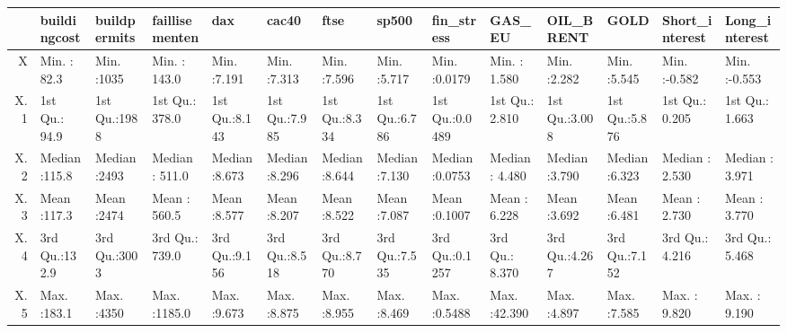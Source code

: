\begin{table}[ht]
\centering
\begin{tabular}{rlllllllllllll}
  \hline
 &  buildingcost &  buildpermits & faillisementen &      dax &     cac40 &      ftse &     sp500 &   fin\_stress &     GAS\_EU &   OIL\_BRENT &      GOLD & Short\_interest & Long\_interest \\ 
  \hline
X & Min.   : 82.3   & Min.   :1035   & Min.   : 143.0   & Min.   :7.191   & Min.   :7.313   & Min.   :7.596   & Min.   :5.717   & Min.   :0.0179   & Min.   : 1.580   & Min.   :2.282   & Min.   :5.545   & Min.   :-0.582   & Min.   :-0.553   \\ 
  X.1 & 1st Qu.: 94.9   & 1st Qu.:1988   & 1st Qu.: 378.0   & 1st Qu.:8.143   & 1st Qu.:7.985   & 1st Qu.:8.334   & 1st Qu.:6.786   & 1st Qu.:0.0489   & 1st Qu.: 2.810   & 1st Qu.:3.008   & 1st Qu.:5.876   & 1st Qu.: 0.205   & 1st Qu.: 1.663   \\ 
  X.2 & Median :115.8   & Median :2493   & Median : 511.0   & Median :8.673   & Median :8.296   & Median :8.644   & Median :7.130   & Median :0.0753   & Median : 4.480   & Median :3.790   & Median :6.323   & Median : 2.530   & Median : 3.971   \\ 
  X.3 & Mean   :117.3   & Mean   :2474   & Mean   : 560.5   & Mean   :8.577   & Mean   :8.207   & Mean   :8.522   & Mean   :7.087   & Mean   :0.1007   & Mean   : 6.228   & Mean   :3.692   & Mean   :6.481   & Mean   : 2.730   & Mean   : 3.770   \\ 
  X.4 & 3rd Qu.:132.9   & 3rd Qu.:3003   & 3rd Qu.: 739.0   & 3rd Qu.:9.156   & 3rd Qu.:8.518   & 3rd Qu.:8.770   & 3rd Qu.:7.535   & 3rd Qu.:0.1257   & 3rd Qu.: 8.370   & 3rd Qu.:4.267   & 3rd Qu.:7.152   & 3rd Qu.: 4.216   & 3rd Qu.: 5.468   \\ 
  X.5 & Max.   :183.1   & Max.   :4350   & Max.   :1185.0   & Max.   :9.673   & Max.   :8.875   & Max.   :8.955   & Max.   :8.469   & Max.   :0.5488   & Max.   :42.390   & Max.   :4.897   & Max.   :7.585   & Max.   : 9.820   & Max.   : 9.190   \\ 
   \hline
\end{tabular}
\end{table}
